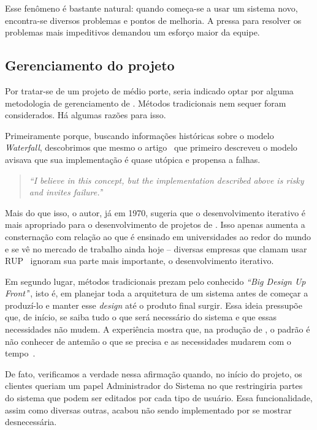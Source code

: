 Esse fenômeno é bastante natural: quando começa-se a usar um sistema novo, encontra-se diversos problemas e pontos de melhoria. A pressa para resolver os problemas mais impeditivos demandou um esforço maior da equipe.

\subsection{Gerenciamento do projeto}

Por tratar-se de um projeto de médio porte, seria indicado optar por alguma metodologia de gerenciamento de \software{}. Métodos tradicionais nem sequer foram considerados. Há algumas razões para isso.

Primeiramente porque, buscando informações históricas sobre o modelo \textit{Waterfall}, descobrimos que mesmo o artigo~\cite{waterfall} que primeiro descreveu o modelo avisava que sua implementação é quase utópica e propensa a falhas.

\begin{quote}
\textit{``I believe in this concept, but the implementation described above is risky and invites failure.'}'
\end{quote}

Mais do que isso, o autor, já em 1970, sugeria que o desenvolvimento iterativo é mais apropriado para o desenvolvimento de projetos de \software{}. Isso apenas aumenta a consternação com relação ao que é ensinado em universidades ao redor do mundo e se vê no mercado de trabalho ainda hoje -- diversas empresas que clamam usar RUP~\cite{rup} ignoram sua parte mais importante, o desenvolvimento iterativo.

Em segundo lugar, métodos tradicionais prezam pelo conhecido \textit{``Big Design Up Front'}', isto é, em planejar toda a arquitetura de um sistema antes de começar a produzí-lo e manter esse \textit{design} até o produto final surgir. Essa ideia pressupõe que, de início, se saiba tudo o que será necessário do sistema e que essas necessidades não mudem. A experiência mostra que, na produção de \software{}, o padrão é não conhecer de antemão o que se precisa e as necessidades mudarem com o tempo~\cite{change}.

De fato, verificamos a verdade nessa afirmação quando, no início do projeto, os clientes queriam um papel Administrador do Sistema no \calopsita{} que restringiria partes do sistema que podem ser editados por cada tipo de usuário. Essa funcionalidade, assim como diversas outras, acabou não sendo implementado por se mostrar desnecessária.

